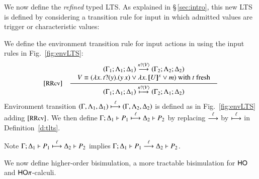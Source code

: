 \smallskip 
\noi We now define the \emph{refined} typed LTS. 
As explained in \S\,\ref{sec:intro}, this new LTS is defined 
by considering a transition rule for input in which admitted values are
 trigger or characteristic values: 

\begin{definition}
\label{def:rlts}
We define the environment transition rule for input actions in
using the input rules in Fig.~\ref{fig:envLTS}: 
\[
\begin{array}{rl}
		\eltsrule{RRcv}&\tree {
\begin{array}{c}
(\Gamma_1; \Lambda_1; \Delta_1) \by{\bactinp{n}{V}} (\Gamma_2; \Lambda_2; \Delta_2)
\\
			\begin{array}{lll}
				 V  \scong
(\abs{{x}}{\binp{t}{y} (\appl{y}{{x}})}
 \vee  \abs{{x}}{\map{U}^{{x}}}  \vee m)  \textrm{ with } t \textrm{ fresh} 
			\end{array}
			\end{array}
		}{
			(\Gamma_1; \Lambda_1; \Delta_1) \hby{\bactinp{n}{V}} (\Gamma_2; \Lambda_1; \Delta_2)
		}
\end{array}
\]
\noi Environment transition
$(\Gamma, \Lambda_1, \Delta_1) \stackrel{\ell}{\longmapsto} (\Gamma, \Lambda_2, \Delta_2)$
is defined as in Fig.~\ref{fig:envLTS} adding 
$\eltsrule{RRcv}$. %
We then define 
$\Gamma; \Delta_1 \vdash P_1 \stackrel{\ell}{\longmapsto} \Delta_2 \vdash P_2$
by replacing $\stackrel{\ell}{\longrightarrow}$ by $\stackrel{\ell}{\longmapsto}$ in Definition~\ref{d:tlts}. 
\end{definition}

\smallskip 

\noi Note 
$\Gamma; \Delta_1 \vdash P_1 \stackrel{\ell}{\longmapsto} \Delta_2 \vdash P_2$ implies  
$\Gamma; \Delta_1 \vdash P_1 \stackrel{\ell}{\longrightarrow} \Delta_2 \vdash P_2$.

\smallskip 

 We now define 
higher-order bisimulation, 
a more tractable bisimulation for $\mathsf{HO}$ and $\mathsf{HO}\pi$-calculi. 

\smallskip 

